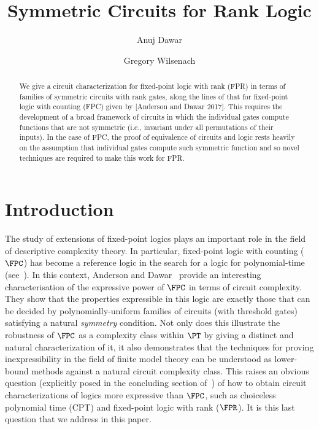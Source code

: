 \documentclass[a4paper,UKenglish]{lipics-v2018}
\title{Symmetric Circuits for Rank Logic}
\author{Anuj Dawar}{University of Cambridge Computer Laboratory\\{Cambridge,
    UK}}{anuj.dawar@cl.cam.ac.uk}{}{}%
\author{Gregory Wilsenach}{University of Cambridge Computer
  Laboratory\\{Cambridge, UK}}{gregory.wilsenach@cl.cam.ac.uk}{}{Funding
  provided by the Gates Cambridge Scholarship}
\begin{document}
\maketitle

\begin{abstract}
We give a circuit characterization for fixed-point logic with rank
(FPR) in terms of families of symmetric circuits with rank gates,
along the lines of that for fixed-point logic with counting (FPC)
given by [Anderson and Dawar 2017].  This requires the development of
a broad framework of circuits in which the individual gates compute
functions that are not symmetric (i.e., invariant under all
permutations of their inputs).  In the case of FPC, the proof of
equivalence of circuits and logic rests heavily on the assumption that
individual gates compute such symmetric function and so novel
techniques are required to make this work for FPR.
\end{abstract}

\section{Introduction}

The study of extensions of fixed-point logics plays an important role in the
field of descriptive complexity theory. In particular, fixed-point logic with
counting ($\FPC$) has become a reference logic in the search for a logic for
polynomial-time (see~\cite{Dawar-siglog}). In this context, Anderson and
Dawar~\cite{AndersonD17} provide an interesting characterisation of the
expressive power of $\FPC$ in terms of circuit complexity. They show that the
properties expressible in this logic are exactly those that can be decided by
polynomially-uniform families of circuits (with threshold gates) satisfying a
natural \emph{symmetry} condition. Not only does this illustrate the robustness
of $\FPC$ as a complexity class within $\PT$ by giving a distinct and natural
characterization of it, it also demonstrates that the techniques for proving
inexpressibility in the field of finite model theory can be understood as
lower-bound methods against a natural circuit complexity class. This raises an
obvious question (explicitly posed in the concluding section
of~\cite{AndersonD17}) of how to obtain circuit characterizations of logics more
expressive than $\FPC$, such as choiceless polynomial time (CPT) and fixed-point
logic with rank ($\FPR$). It is this last question that we address in this
paper.
\end{document}
